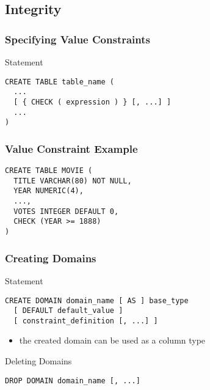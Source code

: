 \documentclass[dvipsnames]{beamer}
\theoremstyle{plain}
\begin{document}
\subsection{Integrity}

\begin{frame}[fragile]
  \frametitle{Specifying Value Constraints}

  \begin{block}{Statement}
    \begin{lstlisting}
CREATE TABLE table_name (
  ...
  [ { CHECK ( expression ) } [, ...] ]
  ...
)
    \end{lstlisting}
  \end{block}
\end{frame}

\begin{frame}[fragile]
  \frametitle{Value Constraint Example}

  \begin{example}
    \begin{lstlisting}
CREATE TABLE MOVIE (
  TITLE VARCHAR(80) NOT NULL,
  YEAR NUMERIC(4),
  ...,
  VOTES INTEGER DEFAULT 0,
  CHECK (YEAR >= 1888)
)
    \end{lstlisting}
  \end{example}
\end{frame}

\begin{frame}[fragile]
  \frametitle{Creating Domains}

  \begin{block}{Statement}
    \begin{lstlisting}
CREATE DOMAIN domain_name [ AS ] base_type
  [ DEFAULT default_value ]
  [ constraint_definition [, ...] ]
    \end{lstlisting}
  \end{block}

  \pause
  \begin{itemize}
    \item the created domain can be used as a column type
  \end{itemize}

  \pause
  \begin{block}{Deleting Domains}
    \begin{lstlisting}
DROP DOMAIN domain_name [, ...]
    \end{lstlisting}
  \end{block}
\end{frame}
\end{document}
